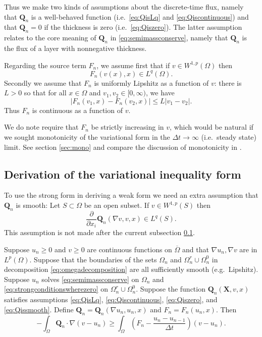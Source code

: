 \documentclass[final,leqno,onefignum,onetabnum]{siamltex1213bueler}
\newcommand\bQ{\mathbf{Q}}
\newcommand\bX{\mathbf{X}}
\renewcommand{\grad}{\nabla}
\begin{document}
Thus we make two kinds of assumptions about the discrete-time flux, namely that $\bQ_n$ is a well-behaved function (i.e.~\eqref{eq:QisLq} and \eqref{eq:Qiscontinuous}) and
that $\bQ_n=0$ if the thickness is zero (i.e.~\eqref{eq:Qiszero}).  The latter assumption relates to the core meaning of $\bQ_n$ in \eqref{eq:semimassconserve}, namely that $\bQ_n$ is the flux of a layer with nonnegative thickness.

Regarding the source term $F_n$, we assume first that if $v\in W^{1,p}(\Omega)$ then
\begin{equation}
F_n(v(x),x) \in L^q(\Omega).  \label{eq:FisLq}
\end{equation}
Secondly we assume that $F_n$ is uniformly Lipshitz as a function of $v$: there is $L>0$ so that for all $x\in\Omega$ and $v_1,v_2 \in [0,\infty)$, we have
\begin{equation}
\left|F_n(v_1,x)-F_n(v_2,x)\right| \le L |v_1-v_2|.  \label{eq:Fislip}
\end{equation}
Thus $F_n$ is continuous as a function of $v$.

We do note require that $F_n$ be strictly increasing in $v$, which would be natural if we sought monotonicity of the variational form in the $\Delta t \to \infty$ (i.e.~steady state) limit.  See section \ref{sec:mono} and compare the discussion of monotonicity in  \cite{JouvetBueler2012}.

\subsection{Derivation of the variational inequality form}  \label{subsec:derivevi}  To use the strong form in deriving a weak form we need an extra assumption that $\bQ_n$ is smooth:  Let $S \subset \Omega$ be an open subset.  If $v\in W^{1,p}(S)$ then
\begin{equation}
\frac{\partial}{\partial x_i} \bQ_n(\grad v,v,x) \in L^q(S). \label{eq:Qissmooth}
\end{equation}
This assumption is not made after the current subsection \ref{subsec:derivevi}.

\medskip
\begin{theorem} \label{thm:strongimpliesweak} Suppose $u_n\ge 0$ and $v\ge 0$ are continuous functions on $\overline{\Omega}$ and that $\grad u_n,\grad v$ are in $L^p(\Omega)$.  Suppose that the boundaries of the sets $\Omega_n$ and $\Omega_n^r \cup \Omega_n^0$ in decomposition \eqref{eq:omegadecomposition} are all sufficiently smooth (e.g.~Lipshitz).  Suppose $u_n$ solves \eqref{eq:semimassconserve} on $\Omega_n$ and \eqref{eq:strongconditionswherezero} on $\Omega_n^r \cup \Omega_n^0$.  Suppose the function $\bQ_n(\bX,v,x)$ satisfies assumptions \eqref{eq:QisLq}, \eqref{eq:Qiscontinuous}, \eqref{eq:Qiszero}, and \eqref{eq:Qissmooth}.  Define $\bQ_n=\bQ_n(\grad u_n,u_n,x)$ and $F_n = F_n(u_n,x)$.  Then
\begin{equation}
-\int_{\Omega} \bQ_n \cdot \grad(v-u_n) \ge \int_{\Omega} \left(F_n - \frac{u_n - u_{n-1}}{\Delta t}\right) (v-u_n). \label{eq:morallytheVI}
\end{equation}
\end{theorem}
\end{document}
